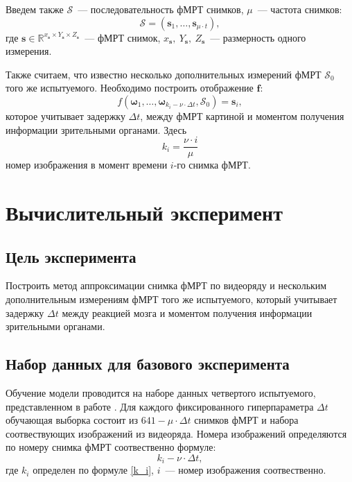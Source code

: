 \documentclass[12pt,twoside]{article}
\begin{document}
Введем также $\mathcal{S}$~--- последовательность фМРТ снимков,  $\mu$~--- частота снимков:
\begin{equation}
    \mathcal{S} = (\bm{s}_{1}, \dots, \bm{s}_{\mu \cdot t}),
\end{equation}
где $\bm{s} \in \mathbb{R}^{x_{\bm{s}} \times Y_{\bm{s}} \times Z_{\bm{s}}}$~--- фМРТ снимок, $x_{\bm{s}},~Y_{\bm{s}},~Z_{\bm{s}}$~--- размерность одного измерения.

Также считаем, что известно несколько дополнительных измерений фМРТ $\mathcal{S}_0$ того же испытуемого.
Необходимо построить отображение $\bm{f}$:
\begin{equation}
    {f}(\bm{\omega}_{1}, \dots, \bm{\omega}_{k_i - \nu \cdot \Delta t}, \mathcal{S}_0) = \bm{s}_i,
\end{equation}
которое учитывает задержку $\Delta t$, между фМРТ картиной и моментом получения информации зрительными органами.
Здесь
\begin{equation}
    \label{k_i}
    k_i = \dfrac{\nu \cdot i}{\mu}
\end{equation}
 номер изображения в момент времени $i$-го снимка фМРТ.
\section{Вычислительный эксперимент}
\subsection{Цель эксперимента}
Построить метод аппроксимации снимка фМРТ по видеоряду и нескольким дополнительным измерениям фМРТ того же испытуемого, который 
учитывает задержку $\Delta t$ между реакцией мозга и моментом получения информации зрительными органами. 
\subsection{Набор данных для базового эксперимента}
Обучение модели проводится на наборе данных четвертого испытуемого, представленном в работе \citep{Berezutskaya2022}. 
Для каждого фиксированного гиперпараметра $\Delta t$ обучающая выборка состоит из $641-\mu \cdot \Delta t$  снимков фМРТ и набора соотвествующих изображений из видеоряда. 
Номера изображений определяются по номеру снимка фМРТ соотвественно формуле:
\begin{equation}
    k_i - \nu \cdot \Delta t,
\end{equation}
где $k_i$ определен по формуле \eqref{k_i}, $i$~--- номер изображения соотвественно.
  
\end{document}

